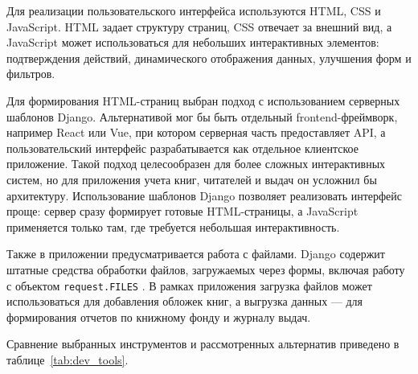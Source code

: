 Для реализации пользовательского интерфейса используются HTML, CSS и JavaScript.
HTML задает структуру страниц, CSS отвечает за внешний вид, а JavaScript может
использоваться для небольших интерактивных элементов: подтверждения действий,
динамического отображения данных, улучшения форм и фильтров.

Для формирования HTML-страниц выбран подход с использованием серверных шаблонов
Django. Альтернативой мог бы быть отдельный frontend-фреймворк, например React
или Vue, при котором серверная часть предоставляет API, а пользовательский
интерфейс разрабатывается как отдельное клиентское приложение. Такой подход
целесообразен для более сложных интерактивных систем, но для приложения учета
книг, читателей и выдач он усложнил бы архитектуру. Использование шаблонов Django
позволяет реализовать интерфейс проще: сервер сразу формирует готовые HTML-страницы,
а JavaScript применяется только там, где требуется небольшая интерактивность.

Также в приложении предусматривается работа с файлами. Django содержит штатные
средства обработки файлов, загружаемых через формы, включая работу с объектом
\texttt{request.FILES} \cite{django_file_uploads}. В рамках приложения загрузка
файлов может использоваться для добавления обложек книг, а выгрузка данных ---
для формирования отчетов по книжному фонду и журналу выдач.

Сравнение выбранных инструментов и рассмотренных альтернатив приведено в
таблице~\ref{tab:dev_tools}.

